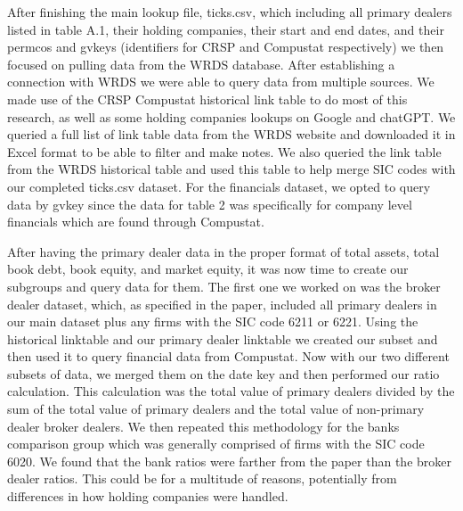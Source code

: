 \documentclass{article}
\begin{document}
After finishing the main lookup file, ticks.csv, which including all primary dealers listed in table A.1, their holding companies, their start and end dates, and their permcos and gvkeys (identifiers for CRSP and Compustat respectively) we then focused on pulling data from the WRDS database. After establishing a connection with WRDS we were able to query data from multiple sources. We made use of the CRSP Compustat historical link table to do most of this research, as well as some holding companies lookups on Google and chatGPT. We queried a full list of link table data from the WRDS website and downloaded it in Excel format to be able to filter and make notes. We also queried the link table from the WRDS historical table and used this table to help merge SIC codes with our completed ticks.csv dataset. For the financials dataset, we opted to query data by gvkey since the data for table 2 was specifically for company level financials which are found through Compustat.

After having the primary dealer data in the proper format of total assets, total book debt, book equity, and market equity, it was now time to create our subgroups and query data for them. The first one we worked on was the broker dealer dataset, which, as specified in the paper, included all primary dealers in our main dataset plus any firms with the SIC code 6211 or 6221. Using the historical linktable and our primary dealer linktable we created our subset and then used it to query financial data from Compustat. Now with our two different subsets of data, we merged them on the date key and then performed our ratio calculation. This calculation was the total value of primary dealers divided by the sum of the total value of primary dealers and the total value of non-primary dealer broker dealers. We then repeated this methodology for the banks comparison group which was generally comprised of firms with the SIC code 6020. We found that the bank ratios were farther from the paper than the broker dealer ratios. This could be for a multitude of reasons, potentially from differences in how holding companies were handled.\par
\end{document}
